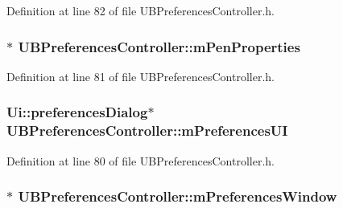 Definition at line 82 of file U\-B\-Preferences\-Controller.\-h.

\hypertarget{class_u_b_preferences_controller_ae3c9a2c79f6e10837f5a7391f42aacb6}{
\subsubsection[{m\-Pen\-Properties}]{$\ast$ U\-B\-Preferences\-Controller\-::m\-Pen\-Properties\hspace{0.3cm}{\ttfamily [protected]}}}\label{d3/d33/class_u_b_preferences_controller_ae3c9a2c79f6e10837f5a7391f42aacb6}


Definition at line 81 of file U\-B\-Preferences\-Controller.\-h.

\hypertarget{class_u_b_preferences_controller_a2aabaddbdc323e70eb3f060b7022399c}{
\subsubsection[{m\-Preferences\-U\-I}]{\setlength{\rightskip}{0pt plus 5cm}Ui\-::preferences\-Dialog$\ast$ U\-B\-Preferences\-Controller\-::m\-Preferences\-U\-I\hspace{0.3cm}{\ttfamily [protected]}}}\label{d3/d33/class_u_b_preferences_controller_a2aabaddbdc323e70eb3f060b7022399c}


Definition at line 80 of file U\-B\-Preferences\-Controller.\-h.

\hypertarget{class_u_b_preferences_controller_a0288d0694614a47ff163395fb0888d8b}{
\subsubsection[{m\-Preferences\-Window}]{$\ast$ U\-B\-Preferences\-Controller\-::m\-Preferences\-Window\hspace{0.3cm}{\ttfamily [protected]}}}\label{d3/d33/class_u_b_preferences_controller_a0288d0694614a47ff163395fb0888d8b}


